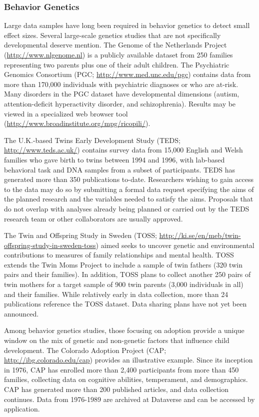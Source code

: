 \documentclass[letterpaper,man,apacite,natbib]{apa6}
\begin{document}
\subsubsection{Behavior Genetics}
Large data samples have long been required in behavior genetics to detect small effect sizes.
Several large-scale genetics studies that are not specifically developmental deserve mention.
The Genome of the Netherlands Project (\url{http://www.nlgenome.nl}) is a publicly available dataset from 250 families representing two parents plus one of their adult children.
The Psychiatric Genomics Consortium (PGC; \url{http://www.med.unc.edu/pgc}) contains data from more than 170,000 individuals with psychiatric diagnoses or who are at-risk.
Many disorders in the PGC dataset have developmental dimensions (autism, attention-deficit hyperactivity disorder, and schizophrenia).
Results may be viewed in a specialized web browser tool (\url{http://www.broadinstitute.org/mpg/ricopili/}).

The U.K.-based Twins Early Development Study (TEDS; \url{http://www.teds.ac.uk/}) contains survey data from 15,000 English and Welsh families who gave birth to twins between 1994 and 1996, with lab-based behavioral task and DNA samples from a subset of participants.
TEDS has generated more than 350 publications to-date.
Researchers wishing to gain access to the data may do so by submitting a formal data request specifying the aims of the planned research and the variables needed to satisfy the aims. 
Proposals that do not overlap with analyses already being planned or carried out by the TEDS research team or other collaborators are usually approved.

The Twin and Offspring Study in Sweden (TOSS; \url{http://ki.se/en/meb/twin-offspring-study-in-sweden-toss}) aimed seeks to uncover genetic and environmental contributions to measures of family relationships and mental health.
TOSS extends the Twin Moms Project to include a sample of twin fathers (320 twin pairs and their families).
In addition, TOSS plans to collect another 250 pairs of twin mothers for a target sample of 900 twin parents (3,000 individuals in all) and their families.
While relatively early in data collection, more than 24 publications reference the TOSS dataset.
Data sharing plans have not yet been announced.

Among behavior genetics studies, those focusing on adoption provide a unique window on the mix of genetic and non-genetic factors that influence child development.
The Colorado Adoption Project (CAP; \url{http://ibg.colorado.edu/cap}) provides an illustrative example.
Since its inception in 1976, CAP has enrolled more than 2,400 participants from more than 450 families, collecting data on cognitive abilities, temperament, and demographics.
CAP has generated more than 200 published articles, and data collection continues.
Data from 1976-1989 are archived at Dataverse and can be accessed by application.
\end{document}
